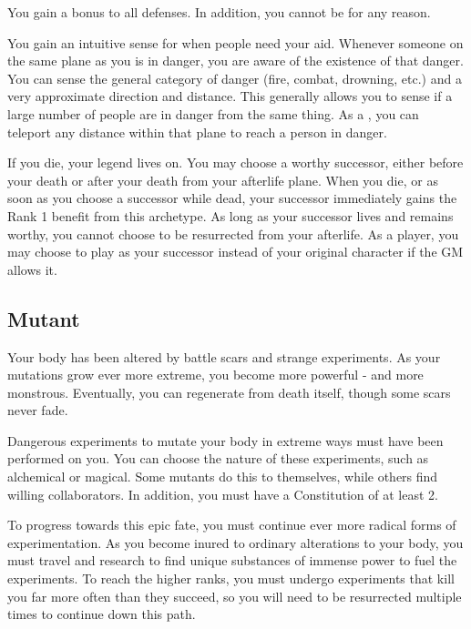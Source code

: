        You gain a  bonus to all defenses.
      In addition, you cannot be \vulnerable for any reason.

       You gain an intuitive sense for when people need your aid.
      Whenever someone on the same plane as you is in danger, you are aware of the existence of that danger.
      You can sense the general category of danger (fire, combat, drowning, etc.) and a very approximate direction and distance.
      This generally allows you to sense if a large number of people are in danger from the same thing.
      As a , you can teleport any distance within that plane to reach a person in danger.

       If you die, your legend lives on.
      You may choose a worthy successor, either before your death or after your death from your afterlife plane.
      When you die, or as soon as you choose a successor while dead, your successor immediately gains the Rank 1 benefit from this archetype.
      As long as your successor lives and remains worthy, you cannot choose to be resurrected from your afterlife.
      As a player, you may choose to play as your successor instead of your original character if the GM allows it.

  \subsection{Mutant}
    Your body has been altered by battle scars and strange experiments.
    As your mutations grow ever more extreme, you become more powerful - and more monstrous.
    Eventually, you can regenerate from death itself, though some scars never fade.

     Dangerous experiments to mutate your body in extreme ways must have been performed on you.
    You can choose the nature of these experiments, such as alchemical or magical.
    Some mutants do this to themselves, while others find willing collaborators.
    In addition, you must have a Constitution of at least 2.

     To progress towards this epic fate, you must continue ever more radical forms of experimentation.
    As you become inured to ordinary alterations to your body, you must travel and research to find unique substances of immense power to fuel the experiments.
    To reach the higher ranks, you must undergo experiments that kill you far more often than they succeed, so you will need to be resurrected multiple times to continue down this path.

